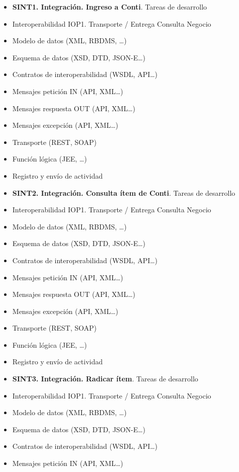 \documentclass[
  paper=a4,
  ,captions=tableheading
]{scrartcl}
\begin{document}
\begin{itemize}
\item
  \textbf{SINT1. Integración. Ingreso a Conti}. Tareas de desarrollo
\item
  Interoperabilidad IOP1. Transporte / Entrega Consulta Negocio
\item
  Modelo de datos (XML, RBDMS, \ldots)
\item
  Esquema de datos (XSD, DTD, JSON-E\ldots)
\item
  Contratos de interoperabilidad (WSDL, API\ldots)
\item
  Mensajes petición IN (API, XML\ldots)
\item
  Mensajes respuesta OUT (API, XML\ldots)
\item
  Mensajes excepción (API, XML\ldots)
\item
  Transporte (REST, SOAP)
\item
  Función lógica (JEE, \ldots)
\item
  Registro y envío de actividad
\item
  \textbf{SINT2. Integración. Consulta ítem de Conti}. Tareas de
  desarrollo
\item
  Interoperabilidad IOP1. Transporte / Entrega Consulta Negocio
\item
  Modelo de datos (XML, RBDMS, \ldots)
\item
  Esquema de datos (XSD, DTD, JSON-E\ldots)
\item
  Contratos de interoperabilidad (WSDL, API\ldots)
\item
  Mensajes petición IN (API, XML\ldots)
\item
  Mensajes respuesta OUT (API, XML\ldots)
\item
  Mensajes excepción (API, XML\ldots)
\item
  Transporte (REST, SOAP)
\item
  Función lógica (JEE, \ldots)
\item
  Registro y envío de actividad
\item
  \textbf{SINT3. Integración. Radicar ítem}. Tareas de desarrollo
\item
  Interoperabilidad IOP1. Transporte / Entrega Consulta Negocio
\item
  Modelo de datos (XML, RBDMS, \ldots)
\item
  Esquema de datos (XSD, DTD, JSON-E\ldots)
\item
  Contratos de interoperabilidad (WSDL, API\ldots)
\item
  Mensajes petición IN (API, XML\ldots)

\end{itemize}
\end{document}
